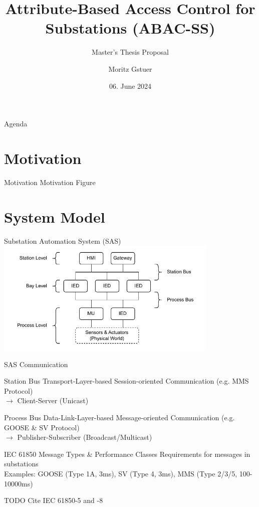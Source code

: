 \documentclass[en]{sdqbeamer}
\title[ABAC for Substations]{Attribute-Based Access Control for Substations (ABAC-SS)}
\subtitle{Master's Thesis Proposal}
\author[Moritz Gstuer]{Moritz Gstuer}
\date[06.\,06.\,2024]{06. June 2024}
\begin{document}
 
\KITtitleframe

\begin{frame}{Agenda}
\tableofcontents
\end{frame}

\section{Motivation}
\begin{frame}{Motivation}
    Motivation Figure
\end{frame}

\section{System Model}
\begin{frame}{Substation Automation System (SAS)}
    \centering
	\includegraphics[width=0.8\textwidth]{./figures/substation_architecture.drawio.pdf}
\end{frame}

\begin{frame}{SAS Communication}
    \begin{blueblock}{Station Bus}
        Transport-Layer-based Session-oriented Communication (e.g. MMS Protocol)
        \\$\rightarrow$ Client-Server (Unicast)
    \end{blueblock}
    \begin{blueblock}{Process Bus}
        Data-Link-Layer-based Message-oriented Communication (e.g. GOOSE \& SV Protocol)
        \\$\rightarrow$ Publisher-Subscriber (Broadcast/Multicast)
    \end{blueblock}
    \begin{grayblock}{IEC 61850 Message Types \& Performance Classes}
        Requirements for messages in substations
        \\Examples: GOOSE (Type 1A, 3ms), SV (Type 4, 3ms), MMS (Type 2/3/5, 100-10000ms)
    \end{grayblock}
    TODO Cite IEC 61850-5 and -8
\end{frame}
\end{document}
